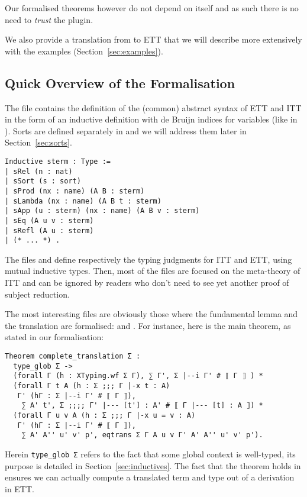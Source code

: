 Our formalised theorems however do not depend on \TemplateCoq itself and as such
there is no need to \emph{trust} the plugin.

We also provide a translation from \TemplateCoq to ETT that we will describe
more extensively with the examples (Section~\ref{sec:examples}).

\subsection{Quick Overview of the Formalisation}

The file  contains the definition of the (common) abstract syntax
of ETT and ITT in the form of an inductive definition with de Bruijn
indices for variables (like in \TemplateCoq).
Sorts are defined separately in  and we will address them later
in Section~\ref{sec:sorts}.

\begin{verbatim}
Inductive sterm : Type :=
| sRel (n : nat)
| sSort (s : sort)
| sProd (nx : name) (A B : sterm)
| sLambda (nx : name) (A B t : sterm)
| sApp (u : sterm) (nx : name) (A B v : sterm)
| sEq (A u v : sterm)
| sRefl (A u : sterm)
| (* ... *) .
\end{verbatim}

The files  and  define respectively the
typing judgments for ITT and ETT, using mutual inductive types.
Then, most of the files are focused on the meta-theory of ITT and can be ignored
by readers who don't need to see yet another proof of subject reduction.

The most interesting files are obviously those where the fundamental lemma
and the translation are formalised:  and
.
For instance, here is the main theorem, as stated in our formalisation:
%
\begin{verbatim}
Theorem complete_translation Σ :
  type_glob Σ ->
  (forall Γ (h : XTyping.wf Σ Γ), ∑ Γ', Σ |--i Γ' # ⟦ Γ ⟧ ) *
  (forall Γ t A (h : Σ ;;; Γ |-x t : A)
   Γ' (hΓ : Σ |--i Γ' # ⟦ Γ ⟧),
    ∑ A' t', Σ ;;;; Γ' |--- [t'] : A' # ⟦ Γ |--- [t] : A ⟧) *
  (forall Γ u v A (h : Σ ;;; Γ |-x u = v : A)
   Γ' (hΓ : Σ |--i Γ' # ⟦ Γ ⟧),
    ∑ A' A'' u' v' p', eqtrans Σ Γ A u v Γ' A' A'' u' v' p').
\end{verbatim}
%
Herein \texttt{type_glob Σ} refers to the fact that some global
context is well-typed, its purpose is detailed in
Section~\ref{sec:inductives}.
The fact that the theorem holds in \Coq ensures we can actually
compute a translated term and type out of a derivation in ETT.


